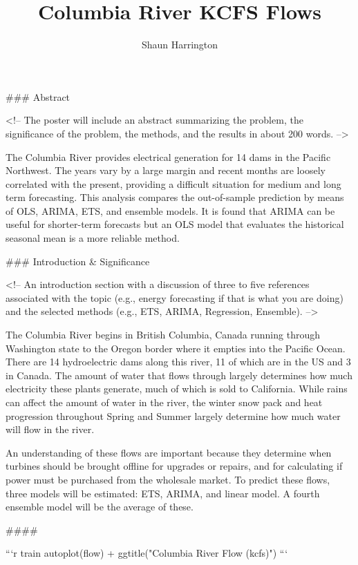 \documentclass[
]{article}
\title{Columbia River KCFS Flows}
\author{Shaun Harrington}
\date{}
\begin{document}
\maketitle

\begin{multicols}{4}

### Abstract

<!-- The poster will include an abstract summarizing the problem, the significance of the problem, the methods, and the results in about 200 words. -->

The Columbia River provides electrical generation for 14 dams in the Pacific Northwest. The years vary by a large margin and recent months are loosely correlated with the present, providing a difficult situation for medium and long term forecasting. This analysis compares the out-of-sample prediction by means of OLS, ARIMA, ETS, and ensemble models. It is found that ARIMA can be useful for shorter-term forecasts but an OLS model that evaluates the historical seasonal mean is a more reliable method.


### Introduction & Significance

<!-- An introduction section with a discussion of three to five references associated with the topic (e.g., energy forecasting if that is what you are doing) and the selected methods (e.g., ETS, ARIMA, Regression, Ensemble). -->

The Columbia River begins in British Columbia, Canada running through Washington state to the Oregon border where it empties into the Pacific Ocean. There are 14 hydroelectric dams along this river, 11 of which are in the US and 3 in Canada. The amount of water that flows through largely determines how much electricity these plants generate, much of which is sold to California. While rains can affect the amount of water in the river, the winter snow pack and heat progression throughout Spring and Summer largely determine how much water will flow in the river. 

An understanding of these flows are important because they determine when turbines should be brought offline for upgrades or repairs, and for calculating if power must be purchased from the wholesale market. To predict these flows, three models will be estimated: ETS, ARIMA, and linear model. A fourth ensemble model will be the average of these. 

####


```r
train %
    autoplot(flow) +
    ggtitle("Columbia River Flow (kcfs)")
```


\end{multicols}
\end{document}
